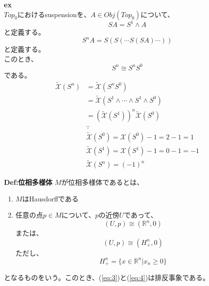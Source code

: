 \documentclass[a4paper,11pt]{jsarticle}
\numberwithin{equation}{section}
\begin{document}
\textbf{ex}\\
$Top_0$におけるsuspensionを、$A \in Obj(Top_0)$について、
\begin{equation}
  SA = S^1 \wedge A
\end{equation}
と定義する。\\
\begin{equation}
  S^n A = S(S(\cdots S(SA)\cdots))
\end{equation}
と定義する。\\
このとき、
\begin{equation}
  S^n \cong S^n S^0
\end{equation}
である。\\
\begin{align}
  \tilde{\mathcal{X}}(S^n) &= \tilde{\mathcal{X}}(S^n S^0)\\
  &= \tilde{\mathcal{X}}(S^1 \wedge \cdots \wedge S^1 \wedge S^0)\\
  &= (\tilde{\mathcal{X}}(S^1) )^n \tilde{\mathcal{X}}(S^0)\\
  &\because \\
  & \tilde{\mathcal{X}}(S^0) = \mathcal{X}(S^0) - 1 = 2-1 = 1\\
  & \tilde{\mathcal{X}}(S^1) = \mathcal{X}(S^1) - 1 = 0-1 = -1\\
  & \tilde{\mathcal{X}}(S^n) = (-1)^n
\end{align}

\begin{itembox}[l]{\textbf{Def:位相多様体}}
  $M$が位相多様体であるとは、
  \begin{enumerate}
    \item $M$はHausdorffである
    \item 任意の点$p \in M$について、$p$の近傍$U$であって、
    \begin{equation}
      (U,p) \cong (\mathbb{R}^n,0) \label{eq:3}
    \end{equation}
    または、
    \begin{equation}
      (U,p) \cong (H^n_+,0) \label{eq:4}
    \end{equation}
    ただし、
    \begin{equation}
      H^n_+ = \{x \in \mathbb{R}^n | x_n \geq 0\}
    \end{equation}
  \end{enumerate}
  となるものをいう。このとき、(\ref{eq:3})と(\ref{eq:4})は排反事象である。
      
\end{itembox}
\end{document}
